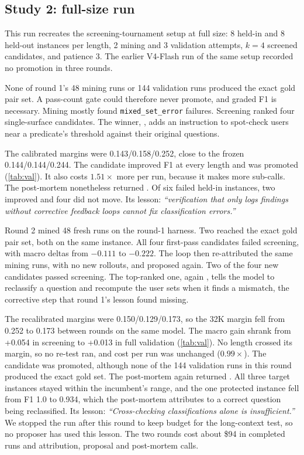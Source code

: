 \subsection{Study 2: full-size run}
This run recreates the screening-tournament setup at full size: 8 held-in and 8
held-out instances per length, 2 mining and 3 validation attempts, $k{=}4$
screened candidates, and patience 3. The earlier V4-Flash run of the same setup
recorded no promotion in three rounds.

None of round 1's 48 mining runs or 144 validation runs produced the exact gold
pair set. A pass-count gate could therefore never promote, and graded F1 is
necessary. Mining mostly found \texttt{mixed\_set\_error} failures. Screening
ranked four single-surface candidates. The winner, , adds an
instruction to spot-check users near a predicate's threshold against their
original questions.

The calibrated margins were 0.143/0.158/0.252, close to the frozen
0.144/0.144/0.244. The candidate
improved F1 at every length and was promoted (\cref{tab:val}). It also costs
$1.51\times$ more per run, because it makes more sub-calls. The post-mortem
nonetheless returned . Of six failed held-in instances, two
improved and four did not move. Its lesson: \emph{``verification that only logs
findings without corrective feedback loops cannot fix classification
errors.''}

Round 2 mined 48 fresh runs on the round-1 harness. Two reached the exact gold
pair set, both on the same instance. All four first-pass candidates failed
screening, with macro deltas from $-0.111$ to $-0.222$. The loop then
re-attributed the same mining runs, with no new rollouts, and proposed again.
Two of the four new candidates passed screening. The top-ranked one, again
, tells the model to reclassify a question and recompute the user sets
when it finds a mismatch, the corrective step that round 1's lesson found
missing.

The recalibrated margins were 0.150/0.129/0.173, so the 32K margin fell from
0.252 to 0.173 between rounds on the same model. The macro gain shrank from
+0.054 in screening to +0.013 in full validation (\cref{tab:val}). No length
crossed its margin, so no re-test ran, and cost per run was unchanged
($0.99\times$). The candidate was promoted, although none of the 144 validation
runs in this round produced the exact gold set. The post-mortem again returned
. All three target instances stayed within the incumbent's
range, and the one protected instance fell from F1 1.0 to 0.934, which the
post-mortem attributes to a correct question being reclassified. Its lesson:
\emph{``Cross-checking classifications alone is insufficient.''} We stopped the
run after this round to keep budget for the long-context test, so no proposer
has used this lesson. The two rounds cost about \$94 in completed runs and
attribution, proposal and post-mortem calls.

